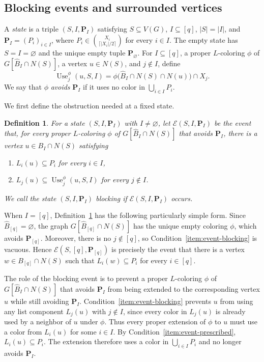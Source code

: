 \documentclass[12pt]{article}
\numberwithin{equation}{section}
\newtheorem{definition}[theorem]{Definition}
\theoremstyle{definition}
\newcommand{\Use}{\operatorname{Use}}
\begin{document}
\subsection{Blocking events and surrounded vertices}\label{subsec:blocking-events}

A \emph{state} is a triple $(S,I,\mathbf{P}_I)$ satisfying
$S \subseteq V(G)$,
$I \subseteq [q]$, $|S| = |I|$, and
$\mathbf{P}_I = (P_i)_{i \in I}$, where
$P_i\in\binom{X_i}{\lceil |X_i|/2\rceil}$ for every $i\in I$.
The empty state has $S = I = \varnothing$ and the unique empty tuple
$\mathbf{P}_\varnothing$.
For $I \subseteq [q]$, a proper $L$-coloring $\phi$ of
$G[\hat{B}_{I} \cap N(S)]$, a vertex $u \in N(S)$, and $j \notin I$, define
\[
 \Use_j^\phi(u, S, I) =
 \phi\bigl(\hat{B}_{I} \cap N(S) \cap N(u)\bigr) \cap X_j.
\]
We say that $\phi$ \emph{avoids} $\mathbf{P}_I$ if it uses no color in
$\bigcup_{i \in I}P_i$.

We first define the obstruction needed at a fixed state.

\begin{definition}\label{def:blocking-events}
For a state $(S,I,\mathbf{P}_I)$ with $I \ne \varnothing$, let
$\mathcal{E}(S,I,\mathbf{P}_I)$ be the event that, for every proper
$L$-coloring $\phi$ of
$G[\hat{B}_{I} \cap N(S)]$ that avoids $\mathbf{P}_I$, there is a vertex
$u \in B_I \cap N(S)$ satisfying
\begin{enumerate}[label=(\alph*),ref=(\alph*)]
\item\label{item:event-prescribed}
$L_i(u) \subseteq P_i$ for every $i \in I$,
\item\label{item:event-blocking}
$L_j(u) \subseteq \Use_j^\phi(u, S, I)$ for every $j \notin I$.
\end{enumerate}
We call the state $(S,I,\mathbf{P}_I)$ \emph{blocking} if
$\mathcal{E}(S,I,\mathbf{P}_I)$ occurs.
\end{definition}

When $I = [q]$, Definition~\ref{def:blocking-events} has the following
particularly simple form. Since $\hat{B}_{[q]} = \varnothing$, the graph
$G[\hat{B}_{[q]} \cap N(S)]$ has the unique empty coloring $\phi$, which
avoids $\mathbf{P}_{[q]}$. Moreover, there is no $j \notin [q]$, so
Condition~\ref{item:event-blocking} is vacuous. Hence
$\mathcal{E}(S,[q],\mathbf{P}_{[q]})$ is precisely the event that there is a
vertex $w \in B_{[q]} \cap N(S)$ such that
$L_i(w) \subseteq P_i$ for every $i \in [q]$.

The role of the blocking event is to prevent a proper $L$-coloring $\phi$
of $G[\hat{B}_I\cap N(S)]$ that avoids $\mathbf{P}_I$ from being extended
to the corresponding vertex $u$ while still avoiding $\mathbf{P}_I$.
Condition~\ref{item:event-blocking} prevents $u$ from using any list
component $L_j(u)$ with $j\notin I$, since every color in $L_j(u)$ is
already used by a neighbor of $u$ under $\phi$. Thus every proper extension
of $\phi$ to $u$ must use a color from $L_i(u)$ for some $i\in I$. By
Condition~\ref{item:event-prescribed}, $L_i(u)\subseteq P_i$. The extension
therefore uses a color in $\bigcup_{i\in I}P_i$ and no longer avoids
$\mathbf{P}_I$.
 
\end{document}
